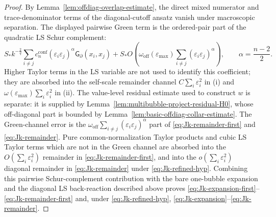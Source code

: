 \documentclass[11pt,reqno,a4paper]{amsart}
\numberwithin{equation}{section}
\theoremstyle{plain}
\theoremstyle{remark}
\theoremstyle{plain}
\begin{document}
\begin{proof}
By Lemma~\ref{lem:offdiag-overlap-estimate}, the direct mixed numerator and
trace-denominator terms of the diagonal-cutoff ansatz vanish under macroscopic
separation.  The displayed pairwise Green term is the ordered-pair part of the
quadratic LS Schur complement:
\[
S_\ast k^{-\frac2q}
\sum_{i\ne j}
 c_n^{\mathrm{conf}}
(\varepsilon_i\varepsilon_j)^\alpha
\mathsf G_\partial(x_i,x_j)
+
S_\ast O\left(
\omega_{\mathrm{off}}(\varepsilon_{\max})
\sum_{i\ne j}(\varepsilon_i\varepsilon_j)^\alpha
\right),
\qquad
\alpha=\frac{n-2}{2}.
\]
Higher Taylor terms in the LS variable are not used to identify this coefficient;
they are absorbed into the self-scale remainder channel
$C\sum_i\varepsilon_i^2$ in \textup{(i)} and
$\omega(\varepsilon_{\max})\sum_i\varepsilon_i^2$ in \textup{(ii)}.  The
value-level residual estimate used to construct $w$ is separate: it is supplied
by Lemma~\ref{lem:multibubble-project-residual-H0}, whose off-diagonal part is
bounded by Lemma~\ref{lem:basic-offdiag-collar-estimate}.  The Green-channel error
is the $\omega_{\mathrm{off}}\sum_{i\ne j}(\varepsilon_i\varepsilon_j)^\alpha$
part of \eqref{eq:Jk-remainder-first} and \eqref{eq:Jk-remainder}.  Pure
common-normalization Taylor products and cubic LS Taylor terms which are not in the
Green channel are absorbed into the $O(\sum_i\varepsilon_i^2)$ remainder in
\eqref{eq:Jk-remainder-first}, and into the
$o(\sum_i\varepsilon_i^2)$ diagonal remainder in \eqref{eq:Jk-remainder} under
\eqref{eq:Jk-refined-hyp}.  Combining this pairwise Schur-complement contribution
with the bare one-bubble expansion and the diagonal LS back-reaction described
above proves
\eqref{eq:Jk-expansion-first}--\eqref{eq:Jk-remainder-first} and, under
\eqref{eq:Jk-refined-hyp}, \eqref{eq:Jk-expansion}--\eqref{eq:Jk-remainder}.
\end{proof}
\end{document}
